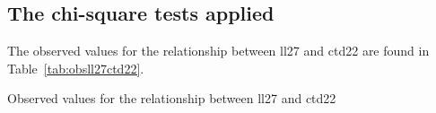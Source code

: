 




\subsection{The chi-square tests applied}
\label{sec:chisqapplied}

The observed values for the relationship between \gls{ll27} and \gls{ctd22} are found in Table~\ref{tab:obsll27ctd22}. 

\begin{table}[h]
  \centering
  
  \caption{Observed values for the relationship between \gls{ll27} and \gls{ctd22}}
  \label{tab:obsll27ctd22}
\end{table}




